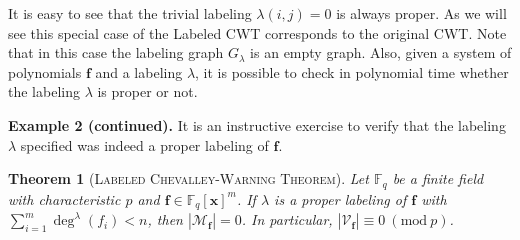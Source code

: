 \documentclass[10pt,a4paper]{article}
\newtheorem{theorem}{Theorem}
\theoremstyle{definition}
\theoremstyle{remark}
\newcommand{\inparen}[1]{\left ( #1 \right )}
\renewcommand{\mod}[1]{~\inparen{\mathrm{mod}~#1}}
\def\abs#1{\left|#1\right|}
\newcommand{\paragr}[1]{\noindent \textbf{\boldmath #1}}
\newcommand{\F}{\ensuremath{\mathbb{F}}}
\newcommand{\calM}{\mathcal{M}}
\newcommand{\calV}{\mathcal{V}}
\newcommand{\vecf}{\ensuremath{\boldsymbol{f}}}
\newcommand{\vecx}{\ensuremath{\boldsymbol{x}}}
\newcommand{\CWT}{CWT\xspace}
\begin{document}
\noindent It is easy to see that the trivial labeling $\lambda(i, j) = 0$ is always proper.
As we will see this special case of the Labeled \CWT\! corresponds to the
original \CWT\!. Note that in this case the
labeling graph $G_{\lambda}$ is an empty graph. Also, given a
system of polynomials $\vecf$ and a labeling $\lambda$, it is possible to
check in polynomial time whether the labeling $\lambda$ is proper or not.

\bigskip
\paragr{Example 2 (continued).} It is an instructive exercise to verify that the labeling $\lambda$ specified was indeed a proper labeling of $\vecf$.
\bigskip


\begin{theorem}[\textsc{Labeled Chevalley-Warning Theorem}]
  \label{thm:labeledChevalleyWarningTheorem}
    Let $\F_q$ be a finite field with characteristic $p$ and
  $\vecf \in \F_q[\vecx]^m$. If $\lambda$ is a proper labeling of
  $\vecf$ with $\sum_{i = 1}^m \deg^{\lambda}(f_i) < n$, then $|\calM_{\vecf}| = 0$. In particular, $\abs{\calV_{\vecf}} \equiv 0 \mod{p}$.
\end{theorem}
\end{document}

